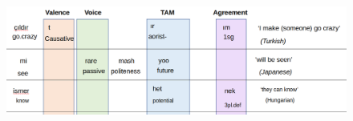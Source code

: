 \documentclass[11pt,letterpaper]{article}
\newcounter{def}
\begin{document}
 \begin{figure}
      \includegraphics[width=\textwidth]{figures/Screenshot from 2021-03-16 10-43-10.png}
 



\end{figure}
\end{document}

